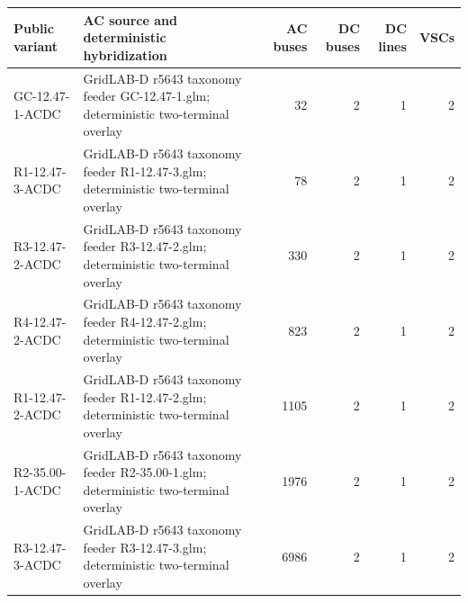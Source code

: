 \begin{tabularx}{\linewidth}{@{}lXrrrr@{}}
\toprule
Public variant & AC source and deterministic hybridization & AC buses & DC buses & DC lines & VSCs \\
\midrule
GC-12.47-1-ACDC & GridLAB-D r5643 taxonomy feeder GC-12.47-1.glm; deterministic two-terminal overlay & 32 & 2 & 1 & 2 \\
R1-12.47-3-ACDC & GridLAB-D r5643 taxonomy feeder R1-12.47-3.glm; deterministic two-terminal overlay & 78 & 2 & 1 & 2 \\
R3-12.47-2-ACDC & GridLAB-D r5643 taxonomy feeder R3-12.47-2.glm; deterministic two-terminal overlay & 330 & 2 & 1 & 2 \\
R4-12.47-2-ACDC & GridLAB-D r5643 taxonomy feeder R4-12.47-2.glm; deterministic two-terminal overlay & 823 & 2 & 1 & 2 \\
R1-12.47-2-ACDC & GridLAB-D r5643 taxonomy feeder R1-12.47-2.glm; deterministic two-terminal overlay & 1105 & 2 & 1 & 2 \\
R2-35.00-1-ACDC & GridLAB-D r5643 taxonomy feeder R2-35.00-1.glm; deterministic two-terminal overlay & 1976 & 2 & 1 & 2 \\
R3-12.47-3-ACDC & GridLAB-D r5643 taxonomy feeder R3-12.47-3.glm; deterministic two-terminal overlay & 6986 & 2 & 1 & 2 \\
\bottomrule
\end{tabularx}

